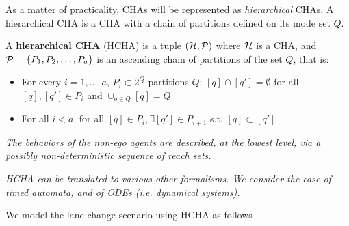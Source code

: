 As a matter of practicality, CHAs will be represented as \emph{hierarchical} CHAs. 
A hierarchical CHA is a CHA with a chain of partitions defined on its mode set $Q$.
\begin{defn}
	A \textbf{hierarchical CHA} (HCHA) is a tuple $(\mathcal{H}, \mathcal{P})$ where $\mathcal{H}$ is a CHA, and $\mathcal{P} = \{P_1,P_2,\ldots,P_a\}$ is an ascending chain of partitions of the set $Q$, that is:
	\begin{itemize}
		\item For every $i =1,\ldots,a$, $P_i \subset 2^Q$ partitions $Q$: $[q] \cap [q'] = \emptyset$ for all $[q],[q'] \in P_i$ and $\cup_{q\in Q}[q] = Q$
		\item For all $i<a$, for all $[q]\in P_i, \exists [q'] \in P_{i+1}$ s.t. $[q] \subset [q']$ 
	\end{itemize}
\end{defn}


{\it The behaviors of the non-ego agents are described, at the lowest level, via a possibly non-deterministic sequence of reach sets.}

{\it HCHA can be translated to various other formalisms. We consider the case of timed automata, and of ODEs (i.e. dynamical systems).}

\begin{exmp}
	We model the lane change scenario using HCHA as follows
	\end{exmp}
